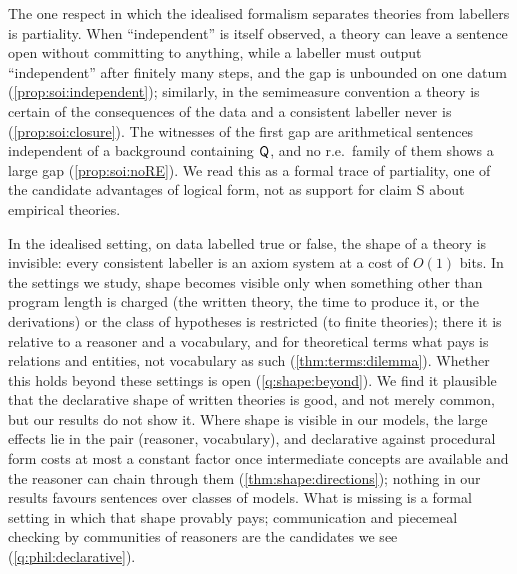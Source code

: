 The one respect in which the idealised formalism separates theories from labellers is partiality. When ``independent'' is itself observed, a theory can leave a sentence open without committing to anything, while a labeller must output ``independent'' after finitely many steps, and the gap is unbounded on one datum (\cref{prop:soi:independent}); similarly, in the semimeasure convention a theory is certain of the consequences of the data and a consistent labeller never is (\cref{prop:soi:closure}). The witnesses of the first gap are arithmetical sentences independent of a background containing $\mathsf{Q}$, and no r.e.\ family of them shows a large gap (\cref{prop:soi:noRE}). We read this as a formal trace of partiality, one of the candidate advantages of logical form, not as support for claim S about empirical theories.

In the idealised setting, on data labelled true or false, the shape of a theory is invisible: every consistent labeller is an axiom system at a cost of $O(1)$ bits. In the settings we study, shape becomes visible only when something other than program length is charged (the written theory, the time to produce it, or the derivations) or the class of hypotheses is restricted (to finite theories); there it is relative to a reasoner and a vocabulary, and for theoretical terms what pays is relations and entities, not vocabulary as such (\cref{thm:terms:dilemma}). Whether this holds beyond these settings is open (\cref{q:shape:beyond}). We find it plausible that the declarative shape of written theories is good, and not merely common, but our results do not show it. Where shape is visible in our models, the large effects lie in the pair (reasoner, vocabulary), and declarative against procedural form costs at most a constant factor once intermediate concepts are available and the reasoner can chain through them (\cref{thm:shape:directions}); nothing in our results favours sentences over classes of models. What is missing is a formal setting in which that shape provably pays; communication and piecemeal checking by communities of reasoners are the candidates we see (\cref{q:phil:declarative}).


